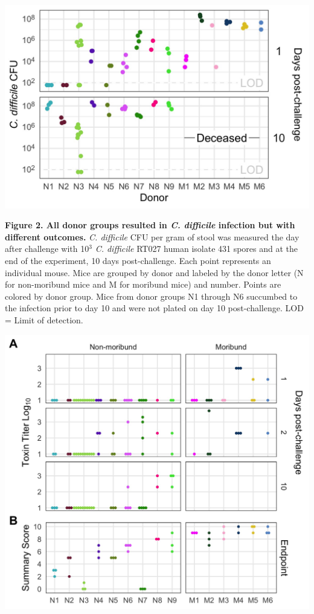 \documentclass[
  12pt,
]{article}
\begin{document}
\includegraphics{../results/figures/figure_2.jpg}

\textbf{Figure 2. All donor groups resulted in \emph{C. difficile}
infection but with different outcomes.} \emph{C. difficile} CFU per gram
of stool was measured the day after challenge with 10\(^{3}\) \emph{C.
difficile} RT027 human isolate 431 spores and at the end of the
experiment, 10 days post-challenge. Each point represents an individual
mouse. Mice are grouped by donor and labeled by the donor letter (N for
non-moribund mice and M for moribund mice) and number. Points are
colored by donor group. Mice from donor groups N1 through N6 succumbed
to the infection prior to day 10 and were not plated on day 10
post-challenge. LOD = Limit of detection.

\hfill\break

\includegraphics{../results/figures/figure_3.jpg}
\end{document}
